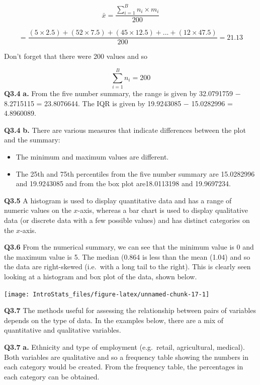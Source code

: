 \documentclass[
  oneside]{krantz}
\begin{document}
\[\bar x = \frac{\sum_{i=1}^B n_i \times m_i}{200} \]

\[  = \frac{(5 \times 2.5) + (52 \times 7.5) + (45 \times 12.5) + ... + (12 \times 47.5)}{200} = 21.13\]

Don't forget that there were 200 values and so

\[\sum_{i=1}^B n_i = 200 \]
\textbf{Q3.4} \textbf{a.} From the five number summary, the range is given by 32.0791759 \(-\) 8.2715115 = 23.8076644. The IQR is given by 19.9243085 \(-\) 15.0282996 = 4.8960089.

\textbf{Q3.4} \textbf{b.} There are various measures that indicate differences between the plot and the summary:

\begin{itemize}
\item
  The minimum and maximum values are different.
\item
  The 25th and 75th percentiles from the five number summary are 15.0282996 and 19.9243085 and from the box plot are18.0113198 and 19.9697234.
\end{itemize}

\textbf{Q3.5} A histogram is used to display quantitative data and has a range of numeric values on the \(x\)-axis, whereas a bar chart is used to display qualitative data (or discrete data with a few possible values) and has distinct categories on the \(x\)-axis.

\textbf{Q3.6} From the numerical summary, we can see that the minimum value is 0 and the maximum value is 5. The median (0.864 is less than the mean (1.04) and so the data are right-skewed (i.e.~with a long tail to the right). This is clearly seen looking at a histogram and box plot of the data, shown below.

\begin{center}\texttt{[image: IntroStats\_files/figure-latex/unnamed-chunk-17-1]} \end{center}

\textbf{Q3.7} The methods useful for assessing the relationship between pairs of variables depends on the type of data. In the examples below, there are a mix of quantitative and qualitative variables.

\textbf{Q3.7} \textbf{a.} Ethnicity and type of employment (e.g.~retail, agricultural, medical). Both variables are qualitative and so a frequency table showing the numbers in each category would be created. From the frequency table, the percentages in each category can be obtained.
\end{document}
